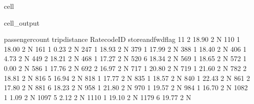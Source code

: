 \documentclass[letterpaper,10pt,english]{sphinxmanual}
\begin{document}
\begin{sphinxuseclass}{cell}
\begin{sphinxuseclass}{cell_output}
\begin{sphinxVerbatim}[commandchars=\\\{\}]
      passenger\PYGZus{}count  trip\PYGZus{}distance  RatecodeID store\PYGZus{}and\PYGZus{}fwd\PYGZus{}flag  \PYGZbs{}
11                  2          18.90           2                  N   
110                 1          18.00           2                  N   
161                 1           0.23           2                  N   
247                 1          18.93           2                  N   
379                 1          17.99           2                  N   
388                 1          18.40           2                  N   
406                 1           4.73           2                  N   
449                 2          18.21           2                  N   
468                 1          17.27           2                  N   
520                 6          18.34           2                  N   
569                 1          18.65           2                  N   
572                 1           0.00           2                  N   
586                 1          17.76           2                  N   
692                 2          16.97           2                  N   
717                 1          20.80           2                  N   
719                 1          21.60           2                  N   
782                 2          18.81           2                  N   
816                 5          16.94           2                  N   
818                 1          17.77           2                  N   
835                 1          18.57           2                  N   
840                 1          22.43           2                  N   
861                 2          17.80           2                  N   
881                 6          18.23           2                  N   
958                 1          21.80           2                  N   
970                 1          19.57           2                  N   
984                 1          16.70           2                  N   
1082                1           1.09           2                  N   
1097                5           2.12           2                  N   
1110                1          19.10           2                  N   
1179                6          19.77           2                  N   


\end{sphinxVerbatim}
\end{sphinxuseclass}
\end{sphinxuseclass}
\end{document}

